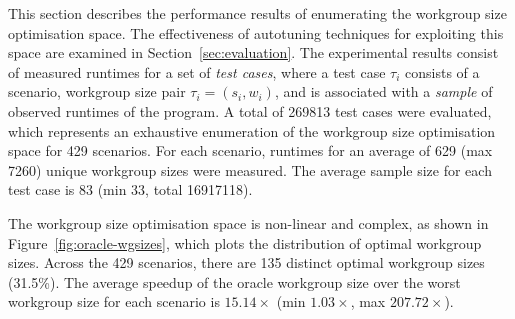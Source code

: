 \documentclass{acaces}
\begin{document}

This section describes the performance results of enumerating the
workgroup size optimisation space. The effectiveness of autotuning
techniques for exploiting this space are examined in
Section~\ref{sec:evaluation}. The experimental results consist of
measured runtimes for a set of \emph{test cases}, where a test case
$\tau_i$ consists of a scenario, workgroup size pair
$\tau_i = (s_i,w_i)$, and is associated with a \emph{sample} of
observed runtimes of the program. A total of 269813 test cases were
evaluated, which represents an exhaustive enumeration of the workgroup
size optimisation space for 429 scenarios. For each scenario, runtimes
for an average of 629 (max 7260) unique workgroup sizes were
measured. The average sample size for each test case is 83 (min 33,
total 16917118).

The workgroup size optimisation space is non-linear and complex, as
shown in Figure~\ref{fig:oracle-wgsizes}, which plots the distribution
of optimal workgroup sizes. Across the 429 scenarios, there are 135
distinct optimal workgroup sizes (31.5\%). The average speedup of the
oracle workgroup size over the worst workgroup size for each scenario
is $15.14\times$ (min $1.03\times$, max $207.72\times$).
\end{document}
